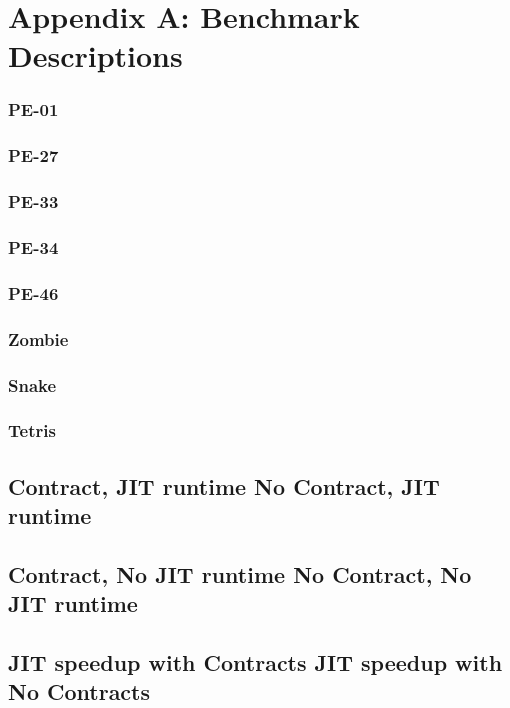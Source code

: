 \newpage
\appendix
\section*{Appendix A: Benchmark Descriptions}
\subsubsection*{PE-01}
\subsubsection*{PE-27}
\subsubsection*{PE-33}
\subsubsection*{PE-34}
\subsubsection*{PE-46}
\subsubsection*{Zombie}
\subsubsection*{Snake}
\subsubsection*{Tetris}

\begin{landscape}
\subsection*{Contract, JIT runtime \hfill{} No Contract, JIT runtime}

\hspace{-1.4cm}\septable{}

\newpage
\subsection*{Contract, No JIT runtime \hfill{} No Contract, No JIT runtime}

\hspace{-1.4cm}\septable{}

\newpage
\subsection*{JIT speedup with Contracts \hfill{} JIT speedup with No Contracts}

\hspace{-1.4cm}\septable{}
\end{landscape}

